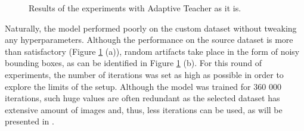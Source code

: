 \begin{figure}[htb]
    \centering
    \qquad
    \caption{Results of the experiments with Adaptive Teacher as it is.}\label{adapt_experiment1}%
\end{figure}

Naturally, the model performed poorly on the custom dataset without tweaking any hyperparameters. Although the performance on the source dataset is more than satisfactory (Figure \ref{adapt_experiment1} (a)), random artifacts take place in the form of noisy bounding boxes, as can be identified in Figure \ref{adapt_experiment1} (b). For this round of experiments, the number of iterations was set as high as possible in order to explore the limits of the setup. Although the model was trained for 360 000 iterations, such huge values are often redundant as the selected dataset has extensive amount of images and, thus, less iterations can be used, as will be presented in . 

